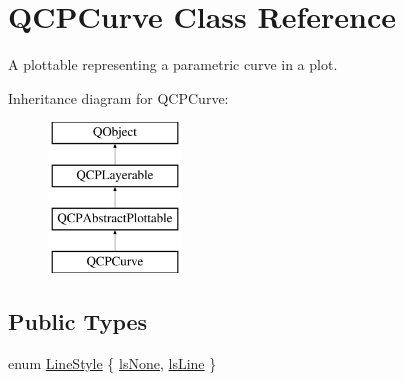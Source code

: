 \hypertarget{classQCPCurve}{\section{Q\-C\-P\-Curve Class Reference}
\label{classQCPCurve}
}


A plottable representing a parametric curve in a plot.  


Inheritance diagram for Q\-C\-P\-Curve\-:\begin{figure}[H]
\begin{center}
\leavevmode
\includegraphics[height=4.000000cm]{classQCPCurve}
\end{center}
\end{figure}
\subsection*{Public Types}
\begin{DoxyCompactItemize}
\item 
enum \hyperlink{classQCPCurve_a2710e9f79302152cff794c6e16cc01f1}{Line\-Style} \{ \hyperlink{classQCPCurve_a2710e9f79302152cff794c6e16cc01f1aec1601a191cdf0b4e761c4c66092cc48}{ls\-None}, 
\hyperlink{classQCPCurve_a2710e9f79302152cff794c6e16cc01f1ade5822ce6fbf131d3df131795c2e1003}{ls\-Line}
 \}
\end{DoxyCompactItemize}
